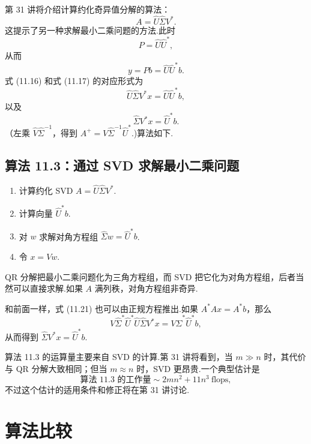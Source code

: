 \documentclass[UTF8,fontset=none,12pt]{ctexart}
\theoremstyle{definition}
\begin{document}
第 31 讲将介绍计算约化奇异值分解的算法：
\[
    A=\widehat U\widehat\Sigma V^*.
\]
这提示了另一种求解最小二乘问题的方法.此时
\[
    P=\widehat U\widehat U^*,
\]
从而
\begin{equation}
    y=Pb=\widehat U\widehat U^*b.
    \tag{11.19}
\end{equation}
式 (11.16) 和式 (11.17) 的对应形式为
\begin{equation}
    \widehat U\widehat\Sigma V^*x=\widehat U\widehat U^*b,
    \tag{11.20}
\end{equation}
以及
\begin{equation}
    \widehat\Sigma V^*x=\widehat U^*b.
    \tag{11.21}
\end{equation}
（左乘 $\widehat V\widehat\Sigma^{-1}$，得到 $A^+=V\widehat\Sigma^{-1}\widehat U^*$.)算法如下.

\subsection*{算法 11.3：通过 SVD 求解最小二乘问题}

\begin{enumerate}
    \item 计算约化 SVD $A=\widehat U\widehat\Sigma V^*$.
    \item 计算向量 $\widehat U^*b$.
    \item 对 $w$ 求解对角方程组 $\widehat\Sigma w=\widehat U^*b$.
    \item 令 $x=Vw$.
\end{enumerate}

QR 分解把最小二乘问题化为三角方程组，而 SVD 把它化为对角方程组，后者当然可以直接求解.如果 $A$ 满列秩，对角方程组非奇异.

和前面一样，式 (11.21) 也可以由正规方程推出.如果 $A^*Ax=A^*b$，那么
\[
    V\widehat\Sigma^*\widehat U^*\widehat U\widehat\Sigma V^*x
    =V\widehat\Sigma^*\widehat U^*b,
\]
从而得到 $\widehat\Sigma V^*x=\widehat U^*b$.

算法 11.3 的运算量主要来自 SVD 的计算.第 31 讲将看到，当 $m\gg n$ 时，其代价与 QR 分解大致相同；但当 $m\approx n$ 时，SVD 更昂贵.一个典型估计是
\begin{equation}
    \text{算法 11.3 的工作量}\sim 2mn^2+11n^3\ \text{flops},
    \tag{11.22}
\end{equation}
不过这个估计的适用条件和修正将在第 31 讲讨论.

\section*{算法比较}
\end{document}
